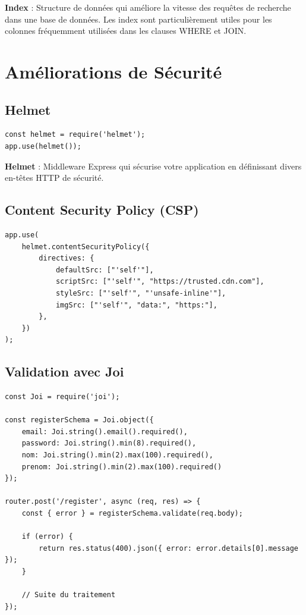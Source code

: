 \begin{definitionbox}
    \textbf{Index} : Structure de données qui améliore la vitesse des requêtes de recherche dans une base de données. Les index sont particulièrement utiles pour les colonnes fréquemment utilisées dans les clauses WHERE et JOIN.
\end{definitionbox}

\section{Améliorations de Sécurité}

\subsection{Helmet}

\begin{lstlisting}[style=javascript, caption=Sécurisation des en-têtes avec Helmet]
const helmet = require('helmet');
app.use(helmet());
\end{lstlisting}

\begin{definitionbox}
    \textbf{Helmet} : Middleware Express qui sécurise votre application en définissant divers en-têtes HTTP de sécurité.
\end{definitionbox}

\subsection{Content Security Policy (CSP)}

\begin{lstlisting}[style=javascript, caption=Configuration CSP]
app.use(
    helmet.contentSecurityPolicy({
        directives: {
            defaultSrc: ["'self'"],
            scriptSrc: ["'self'", "https://trusted.cdn.com"],
            styleSrc: ["'self'", "'unsafe-inline'"],
            imgSrc: ["'self'", "data:", "https:"],
        },
    })
);
\end{lstlisting}

\subsection{Validation avec Joi}

\begin{lstlisting}[style=javascript, caption=Validation avec Joi]
const Joi = require('joi');

const registerSchema = Joi.object({
    email: Joi.string().email().required(),
    password: Joi.string().min(8).required(),
    nom: Joi.string().min(2).max(100).required(),
    prenom: Joi.string().min(2).max(100).required()
});

router.post('/register', async (req, res) => {
    const { error } = registerSchema.validate(req.body);
    
    if (error) {
        return res.status(400).json({ error: error.details[0].message });
    }
    
    // Suite du traitement
});
\end{lstlisting}

